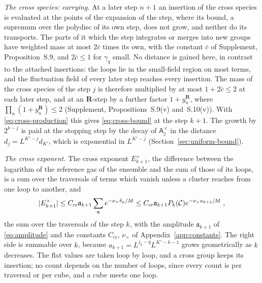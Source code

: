 \documentclass[11pt]{preprint}
\DeclarePairedDelimiter{\abs}{\lvert}{\rvert}
\numberwithin{equation}{section}
\theoremstyle{definition}
\theoremstyle{remark}
\theoremstyle{plain}
\begin{document}
\emph{The cross species: carrying.} At a later step $n + 1$ an insertion of the cross species is evaluated at the points of the expansion of the step, where its bound, a supremum over the polydisc of its own step, does not grow, and neither do its transports. The parts of it which the step integrates or merges into new groups have weighted mass at most $2\bar c$ times its own, with the constant $\bar c$ of Supplement, Proposition~S.9, and $2\bar c \leq 1$ for $\gamma_q$ small. No distance is gained here, in contrast to the attached insertions: the loops lie in the small-field region on most terms, and the fluctuation field of every later step reaches every insertion. The mass of the cross species of the step $j$ is therefore multiplied by at most $1 + 2\bar c \leq 2$ at each later step, and at an $\mathbf R$-step by a further factor $1 + y^{\mathbf R}_n$, where $\prod_n(1 + y^{\mathbf R}_n) \leq 2$ (Supplement, Propositions~S.9(v) and~S.10(v)). With \eqref{eq:cross-production} this gives \eqref{eq:cross-bound} at the step $k + 1$. The growth by $2^{k-j}$ is paid at the stopping step by the decay of $\mathsf A^\times_j$ in the distance $d_j = L^{K'-j}d_{K'}$, which is exponential in $L^{K'-j}$ (Section~\ref{sec:uniform-bound}).

\emph{The cross exponent.} The cross exponent $E^\times_{k+1}$, the difference between the logarithm of the reference gas of the ensemble and the sum of those of its loops, is a sum over the traversals of terms which vanish unless a cluster reaches from one loop to another, and
\begin{equation}\label{eq:cross-exponent}
    \abs{E^\times_{k+1}} \leq C_{\mathrm{cr}}\mathfrak a_{k+1}\sum_{\mathfrak n}e^{-\nu_\times\delta_{\mathfrak n}/M} \leq C_{\mathrm{cr}}\mathfrak a_{k+1}P_k(\mathcal C)e^{-\nu_\times a_{k+1}/M}\;,
\end{equation}
the sum over the traversals of the step $k$, with the amplitude $\mathfrak a_{k+1}$ of \eqref{eq:amplitude} and the constants $C_{\mathrm{cr}}$, $\nu_\times$ of Appendix~\ref{app:constants}. The right side is summable over $k$, because $a_{k+1} = L^{j_q-q}L^{K'-k-1}$ grows geometrically as $k$ decreases. The flat values are taken loop by loop, and a cross group keeps its insertion; no count depends on the number of loops, since every count is per traversal or per cube, and a cube meets one loop.
\end{document}

